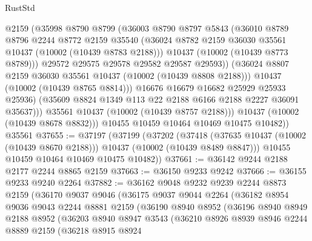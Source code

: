 \begin{lexlean}{RustStd}
\begin{coremodule}
                    @2159
                    (@35998
                      @8790
                      @8799
                      (@36003
                        @8790
                        @8797
                        @5843
                        (@36010
                          @8789
                          @8796
                          @2244
                          @8772
                          @2159
                          @35540
                          (@36024 @8782 @2159 @36030 @35561 @10437 (@10002 (@10439 @8783 @2188)))
                          @10437
                          (@10002 (@10439 @8773 @8789)))
                        @29572
                        @29575
                        @29578
                        @29582
                        @29587
                        @29593))
                    (@36024 @8807 @2159 @36030 @35561 @10437 (@10002 (@10439 @8808 @2188)))
                    @10437
                    (@10002 (@10439 @8765 @8814)))
                  @16676
                  @16679
                  @16682
                  @25929
                  @25933
                  @25936)
                (@35609 @8824 @1349 @113 @22 @2188 @6166 @2188 @2227 @36091 @35637)))
            @35561
            @10437
            (@10002 (@10439 @8757 @2188)))
          @10437
          (@10002 (@10439 @8678 @8832)))
        @10455
        @10459
        @10464
        @10469
        @10475
        @10482))
    @35561
@37655 := @37197
    (@37199
      (@37202
        (@37418 (@37635 @10437 (@10002 (@10439 @8670 @2188))) @10437 (@10002 (@10439 @8489 @8847)))
        @10455
        @10459
        @10464
        @10469
        @10475
        @10482))
@37661 := @36142 @9244 @2188 @2177 @2244 @8865 @2159
@37663 := @36150 @9233 @9242
@37666 := @36155 @9233 @9240 @2264
@37882 := @36162
    @9048
    @9232
    @9239
    @2244
    @8873
    @2159
    (@36170
      @9037
      @9046
      (@36175
        @9037
        @9044
        @2264
        (@36182
          @8954
          @9036
          @9043
          @2244
          @8881
          @2159
          (@36190
            @8940
            @8952
            (@36196
              @8940
              @8949
              @2188
              @8952
              (@36203
                @8940
                @8947
                @3543
                (@36210
                  @8926
                  @8939
                  @8946
                  @2244
                  @8889
                  @2159
                  (@36218
                    @8915
                    @8924

\end{coremodule}
\end{lexlean}
